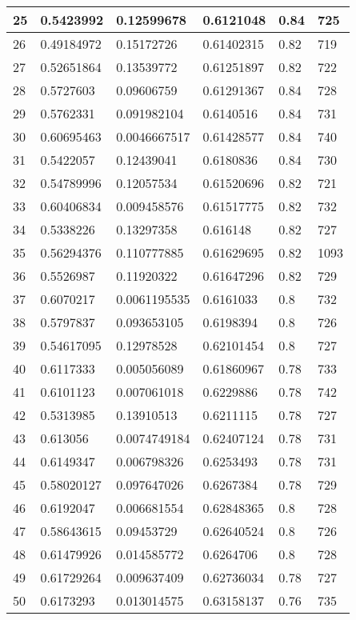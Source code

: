 \begin{longtable}{|l|l|l|l|l|l|}
25 & 0.5423992 & 0.12599678 & 0.6121048 & 0.84 & 725 \\ \hline 
26 & 0.49184972 & 0.15172726 & 0.61402315 & 0.82 & 719 \\ \hline 
27 & 0.52651864 & 0.13539772 & 0.61251897 & 0.82 & 722 \\ \hline 
28 & 0.5727603 & 0.09606759 & 0.61291367 & 0.84 & 728 \\ \hline 
29 & 0.5762331 & 0.091982104 & 0.6140516 & 0.84 & 731 \\ \hline 
30 & 0.60695463 & 0.0046667517 & 0.61428577 & 0.84 & 740 \\ \hline 
31 & 0.5422057 & 0.12439041 & 0.6180836 & 0.84 & 730 \\ \hline 
32 & 0.54789996 & 0.12057534 & 0.61520696 & 0.82 & 721 \\ \hline 
33 & 0.60406834 & 0.009458576 & 0.61517775 & 0.82 & 732 \\ \hline 
34 & 0.5338226 & 0.13297358 & 0.616148 & 0.82 & 727 \\ \hline 
35 & 0.56294376 & 0.110777885 & 0.61629695 & 0.82 & 1093 \\ \hline 
36 & 0.5526987 & 0.11920322 & 0.61647296 & 0.82 & 729 \\ \hline 
37 & 0.6070217 & 0.0061195535 & 0.6161033 & 0.8 & 732 \\ \hline 
38 & 0.5797837 & 0.093653105 & 0.6198394 & 0.8 & 726 \\ \hline 
39 & 0.54617095 & 0.12978528 & 0.62101454 & 0.8 & 727 \\ \hline 
40 & 0.6117333 & 0.005056089 & 0.61860967 & 0.78 & 733 \\ \hline 
41 & 0.6101123 & 0.007061018 & 0.6229886 & 0.78 & 742 \\ \hline 
42 & 0.5313985 & 0.13910513 & 0.6211115 & 0.78 & 727 \\ \hline 
43 & 0.613056 & 0.0074749184 & 0.62407124 & 0.78 & 731 \\ \hline 
44 & 0.6149347 & 0.006798326 & 0.6253493 & 0.78 & 731 \\ \hline 
45 & 0.58020127 & 0.097647026 & 0.6267384 & 0.78 & 729 \\ \hline 
46 & 0.6192047 & 0.006681554 & 0.62848365 & 0.8 & 728 \\ \hline 
47 & 0.58643615 & 0.09453729 & 0.62640524 & 0.8 & 726 \\ \hline 
48 & 0.61479926 & 0.014585772 & 0.6264706 & 0.8 & 728 \\ \hline 
49 & 0.61729264 & 0.009637409 & 0.62736034 & 0.78 & 727 \\ \hline 
50 & 0.6173293 & 0.013014575 & 0.63158137 & 0.76 & 735 \\ \hline 
\end{longtable}